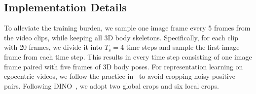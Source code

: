 \begin{table}[t]
  \centering
  \caption{$k$-NN evaluation results on ImageNet-100 and ImageNet-1K. Top1 and Top5 accuracy (\%) are reported.}
  \label{tab:rep}%
  \vspace{-0.5em}
\end{table}%

\subsection{Implementation Details}

To alleviate the training burden, we sample one image frame every 5 frames from the video clips, while keeping all 3D body skeletons. Specifically, for each clip with 20 frames, we divide it into $T_{s}=$4 time steps and sample the first image frame from each time step. This results in every time step consisting of one image frame paired with five frames of 3D body poses. For representation learning on egocentric videos, we follow the practice in~\cite{venkataramanan2023imagenet} to avoid cropping noisy positive pairs. Following DINO~\cite{caron2021emerging}, we adopt two global crops and six local crops.

